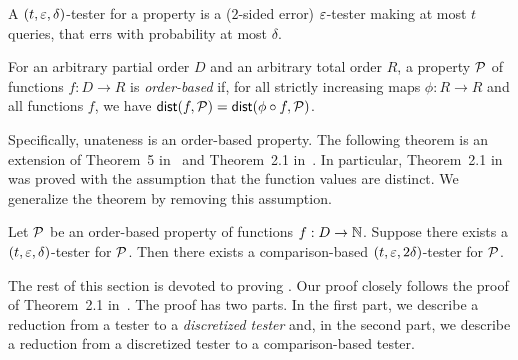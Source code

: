 \begin{definition} \label{def:t-eps-del-tester}
A $(t,\varepsilon,\delta)$-tester for a property is a ($2$-sided error) $\varepsilon$-tester making at most $t$ queries, that errs with probability at most $\delta$.
\end{definition}

\begin{definition}\label{def:obp}
For an arbitrary partial order $D$ and an arbitrary total order $R$, a property $\mathcal{P}$ of functions $f:D \to R$ is {\em order-based} if,
for all strictly increasing maps $\phi: R \to R$ and all functions $f$, we have $\mathsf{dist}(f,\mathcal{P}) = \mathsf{dist}(\phi\circ f, \mathcal{P})$.
\end{definition}

\noindent Specifically, unateness is an order-based property.
The following theorem is an extension of Theorem~5 in~\cite{Fis04} and Theorem~2.1 in~\cite{CS14}.
In particular, Theorem~2.1 in~\cite{CS14} was proved with the assumption that the function values are distinct. We generalize 
the theorem
by removing this assumption.

\begin{theorem}\label{thm:CS14}
Let $\mathcal{P}$ be an order-based property of functions $f:D \to \mathbb N$. Suppose there exists a $(t,\varepsilon,\delta)$-tester for $\mathcal{P}$.
Then there exists a comparison-based $(t,\varepsilon,2\delta)$-tester
for $\mathcal{P}$.
\end{theorem}

The rest of this section is devoted to proving .
Our proof closely follows the proof of Theorem~2.1 in~\cite{CS14}.
The proof has two parts. In the first part, we describe a reduction from a tester to a {\em discretized tester} and, in the second part, we describe a reduction from a discretized tester to a comparison-based tester.

